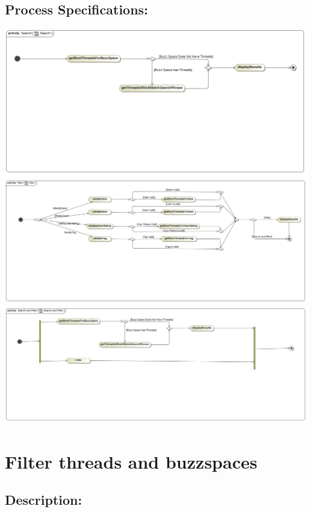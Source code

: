 \documentclass[a4paper,11pt]{article}
\begin{document}
\subsection{Process Specifications:} 
\includegraphics{Images/SearchAndFilter/Search_processSpecification}\\
\includegraphics{Images/SearchAndFilter/Filter_processSpecification}\\
\includegraphics{Images/SearchAndFilter/SearchAndFilter_processSpecification}\\


\section{Filter threads and buzzspaces}
\subsection*{Description:}
\end{document}
